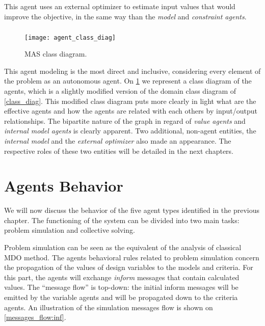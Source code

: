 This agent uses an external optimizer to estimate input values that would improve the objective, in the same way than the \emph{model} and \emph{constraint agents}.

\paragraph*{}

\begin{figure}
\texttt{[image: agent\_class\_diag]}
\caption{MAS class diagram.}\label{MAS_class_diagram}
\end{figure}

This agent modeling is the most direct and inclusive, considering every element of the problem as an autonomous agent. On \figurename{} \ref{MAS_class_diagram} we represent a class diagram of the agents, which is a slightly modified version of the domain class diagram of \figurename{} \ref{class_diag}. This modified class diagram puts more clearly in light what are the effective agents and how the agents are related with each others by input/output relationships. The bipartite nature of the graph in regard of \emph{value agents} and \emph{internal model agents} is clearly apparent. Two additional, non-agent entities, the \emph{internal model} and the \emph{external optimizer} also made an appearance. The respective roles of these two entities will be detailed in the next chapters.

\chapter{Agents Behavior}\label{agent_behav_chap}

We will now discuss the behavior of the five agent types identified in the previous chapter. The functioning of the system can be divided into two main tasks: problem simulation and collective solving.

Problem simulation can be seen as the equivalent of the analysis of classical MDO method. The agents behavioral rules related to problem simulation concern the propagation of the values of design variables to the models and criteria. For this part, the agents will exchange \emph{inform} messages that contain calculated values. The \enquote{message flow} is top-down: the initial inform messages will be emitted by the variable agents and will be propagated down to the criteria agents. An illustration of the simulation messages flow is shown on \figurename{} \ref{messages_flow:inf}.

